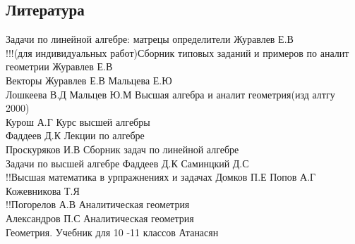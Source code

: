 \documentclass[a4paper, 12pt]{article}
\begin{document}
\subsection*{Литература}
Задачи по линейной алгебре: матрецы определители Журавлев Е.В\\
!!!(для индивидуальных работ)Сборник типовых заданий и примеров по аналит геометрии Журавлев Е.В\\
Векторы Журавлев Е.В Мальцева Е.Ю\\
Лошкеева В.Д Мальцев Ю.М Высшая алгебра и аналит геометрия(изд алтгу 2000)\\
Курош А.Г Курс высшей алгебры\\
Фаддеев Д.К Лекции по алгебре\\
Проскуряков И.В Сборник задач по линейной алгебре\\
Задачи по высшей алгебре Фаддеев Д.К Саминцкий Д.С\\
!!Высшая математика в урпражнениях и задачах Домков П.Е Попов А.Г Кожевникова Т.Я\\
!!Погорелов А.В Аналитическая геометрия\\
Александров П.С Аналитическая геометрия\\
Геометрия. Учебник для 10 -11 классов Атанасян\\
\end{document}
